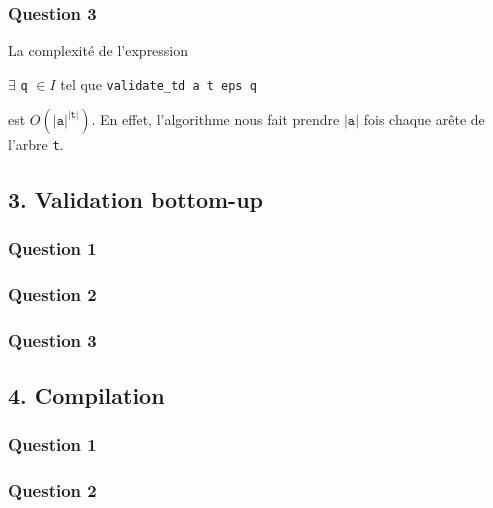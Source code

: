 \documentclass[a4paper,12pt]{article}
\newcommand{\ocaml}[1]{\texttt{#1}}
\begin{document}
\subsubsection*{Question 3}

La complexité de l'expression

\centerline{
$\exists$ \ocaml{q} $\in I$ tel que \ocaml{validate_td a t eps q}
}

est $O(|\ocaml{a}|^{|\ocaml{t}|})$. En effet, l'algorithme
nous fait prendre $|\ocaml{a}|$ fois chaque arête de l'arbre \ocaml{t}.


\subsection*{3. Validation bottom-up}
\subsubsection*{Question 1}
\subsubsection*{Question 2}
\subsubsection*{Question 3}


\subsection*{4. Compilation}
\subsubsection*{Question 1}
\subsubsection*{Question 2}
\end{document}
